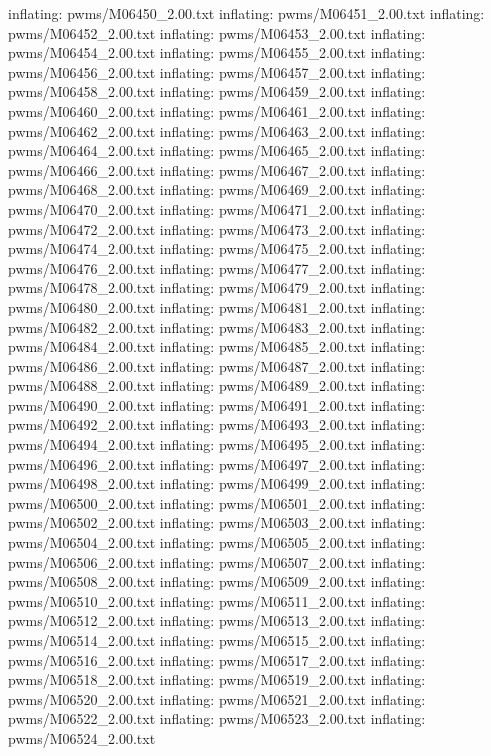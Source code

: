 \documentclass[letterpaper,10pt,english]{sphinxmanual}
\begin{document}
{\begin{sphinxVerbatim}[commandchars=\\\{\}]
  inflating: pwms/M06450\_2.00.txt
  inflating: pwms/M06451\_2.00.txt
  inflating: pwms/M06452\_2.00.txt
  inflating: pwms/M06453\_2.00.txt
  inflating: pwms/M06454\_2.00.txt
  inflating: pwms/M06455\_2.00.txt
  inflating: pwms/M06456\_2.00.txt
  inflating: pwms/M06457\_2.00.txt
  inflating: pwms/M06458\_2.00.txt
  inflating: pwms/M06459\_2.00.txt
  inflating: pwms/M06460\_2.00.txt
  inflating: pwms/M06461\_2.00.txt
  inflating: pwms/M06462\_2.00.txt
  inflating: pwms/M06463\_2.00.txt
  inflating: pwms/M06464\_2.00.txt
  inflating: pwms/M06465\_2.00.txt
  inflating: pwms/M06466\_2.00.txt
  inflating: pwms/M06467\_2.00.txt
  inflating: pwms/M06468\_2.00.txt
  inflating: pwms/M06469\_2.00.txt
  inflating: pwms/M06470\_2.00.txt
  inflating: pwms/M06471\_2.00.txt
  inflating: pwms/M06472\_2.00.txt
  inflating: pwms/M06473\_2.00.txt
  inflating: pwms/M06474\_2.00.txt
  inflating: pwms/M06475\_2.00.txt
  inflating: pwms/M06476\_2.00.txt
  inflating: pwms/M06477\_2.00.txt
  inflating: pwms/M06478\_2.00.txt
  inflating: pwms/M06479\_2.00.txt
  inflating: pwms/M06480\_2.00.txt
  inflating: pwms/M06481\_2.00.txt
  inflating: pwms/M06482\_2.00.txt
  inflating: pwms/M06483\_2.00.txt
  inflating: pwms/M06484\_2.00.txt
  inflating: pwms/M06485\_2.00.txt
  inflating: pwms/M06486\_2.00.txt
  inflating: pwms/M06487\_2.00.txt
  inflating: pwms/M06488\_2.00.txt
  inflating: pwms/M06489\_2.00.txt
  inflating: pwms/M06490\_2.00.txt
  inflating: pwms/M06491\_2.00.txt
  inflating: pwms/M06492\_2.00.txt
  inflating: pwms/M06493\_2.00.txt
  inflating: pwms/M06494\_2.00.txt
  inflating: pwms/M06495\_2.00.txt
  inflating: pwms/M06496\_2.00.txt
  inflating: pwms/M06497\_2.00.txt
  inflating: pwms/M06498\_2.00.txt
  inflating: pwms/M06499\_2.00.txt
  inflating: pwms/M06500\_2.00.txt
  inflating: pwms/M06501\_2.00.txt
  inflating: pwms/M06502\_2.00.txt
  inflating: pwms/M06503\_2.00.txt
  inflating: pwms/M06504\_2.00.txt
  inflating: pwms/M06505\_2.00.txt
  inflating: pwms/M06506\_2.00.txt
  inflating: pwms/M06507\_2.00.txt
  inflating: pwms/M06508\_2.00.txt
  inflating: pwms/M06509\_2.00.txt
  inflating: pwms/M06510\_2.00.txt
  inflating: pwms/M06511\_2.00.txt
  inflating: pwms/M06512\_2.00.txt
  inflating: pwms/M06513\_2.00.txt
  inflating: pwms/M06514\_2.00.txt
  inflating: pwms/M06515\_2.00.txt
  inflating: pwms/M06516\_2.00.txt
  inflating: pwms/M06517\_2.00.txt
  inflating: pwms/M06518\_2.00.txt
  inflating: pwms/M06519\_2.00.txt
  inflating: pwms/M06520\_2.00.txt
  inflating: pwms/M06521\_2.00.txt
  inflating: pwms/M06522\_2.00.txt
  inflating: pwms/M06523\_2.00.txt
  inflating: pwms/M06524\_2.00.txt

\end{sphinxVerbatim}}
\end{document}
